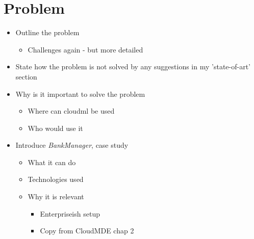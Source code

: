 \section{Problem}

\begin{itemize}
  \item Outline the problem
    \begin{itemize}
      \item Challenges again - but more detailed
    \end{itemize}
  \item State how the problem is not solved by any suggestions in my 'state-of-art' section
  \item Why is it important to solve the problem
  \begin{itemize}
    \item Where can cloudml be used
    \item Who would use it
  \end{itemize}
  \item Introduce \emph{BankManager}, case study
  \begin{itemize}
    \item What it can do
    \item Technologies used
    \item Why it is relevant
      \begin{itemize}
        \item Enterpriseish setup
        \item Copy from CloudMDE chap 2
      \end{itemize}
  \end{itemize}
\end{itemize}
